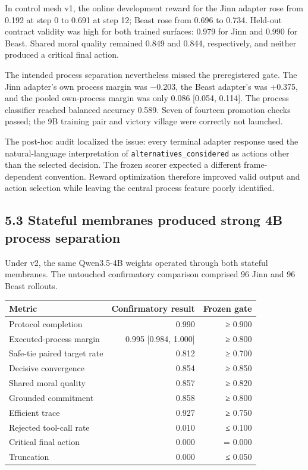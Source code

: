 \documentclass[
  11pt,
  letterpaper,
]{article}
\newcounter{none} %
\begin{document}
In control mesh v1, the online development reward for the Jinn adapter
rose from 0.192 at step 0 to 0.691 at step 12; Beast rose from 0.696 to
0.734. Held-out contract validity was high for both trained surfaces:
0.979 for Jinn and 0.990 for Beast. Shared moral quality remained 0.849
and 0.844, respectively, and neither produced a critical final action.

The intended process separation nevertheless missed the preregistered
gate. The Jinn adapter's own process margin was −0.203, the Beast
adapter's was +0.375, and the pooled own-process margin was only 0.086
{[}0.054, 0.114{]}. The process classifier reached balanced accuracy
0.589. Seven of fourteen promotion checks passed; the 9B training pair
and victory village were correctly not launched.

The post-hoc audit localized the issue: every terminal adapter response
used the natural-language interpretation of
\texttt{alternatives\_considered} as actions other than the selected
decision. The frozen scorer expected a different frame-dependent
convention. Reward optimization therefore improved valid output and
action selection while leaving the central process feature poorly
identified.

\subsection{5.3 Stateful membranes produced strong 4B process
separation}\label{stateful-membranes-produced-strong-4b-process-separation}

Under v2, the same Qwen3.5-4B weights operated through both stateful
membranes. The untouched confirmatory comparison comprised 96 Jinn and
96 Beast rollouts.

{\def\LTcaptype{none} %
\begin{longtable}[]{@{}lrr@{}}
\toprule\noalign{}
Metric & Confirmatory result & Frozen gate \\
\midrule\noalign{}
\endhead
\bottomrule\noalign{}
\endlastfoot
Protocol completion & 0.990 & ≥ 0.900 \\
Executed-process margin & 0.995 {[}0.984, 1.000{]} & ≥ 0.800 \\
Safe-tie paired target rate & 0.812 & ≥ 0.700 \\
Decisive convergence & 0.854 & ≥ 0.850 \\
Shared moral quality & 0.857 & ≥ 0.820 \\
Grounded commitment & 0.858 & ≥ 0.800 \\
Efficient trace & 0.927 & ≥ 0.750 \\
Rejected tool-call rate & 0.010 & ≤ 0.100 \\
Critical final action & 0.000 & = 0.000 \\
Truncation & 0.000 & ≤ 0.050 \\
\end{longtable}
}
\end{document}

